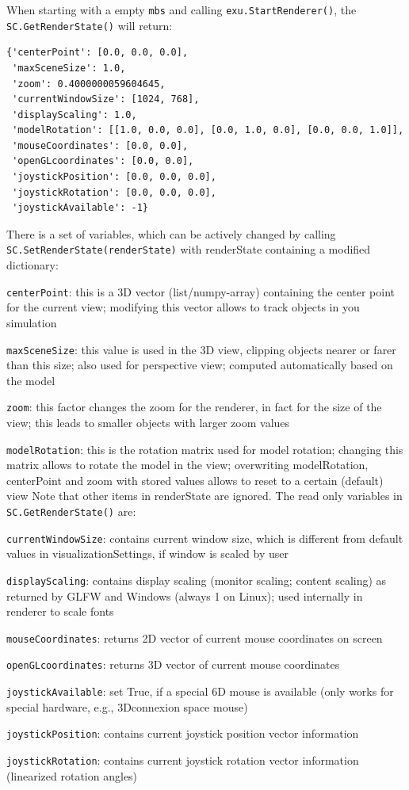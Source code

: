 When starting with a empty \texttt{mbs} and calling \texttt{exu.StartRenderer()}, the \texttt{SC.GetRenderState()} will return:
\pythonstyle\begin{lstlisting}
{'centerPoint': [0.0, 0.0, 0.0],
 'maxSceneSize': 1.0,
 'zoom': 0.4000000059604645,
 'currentWindowSize': [1024, 768],
 'displayScaling': 1.0,
 'modelRotation': [[1.0, 0.0, 0.0], [0.0, 1.0, 0.0], [0.0, 0.0, 1.0]],
 'mouseCoordinates': [0.0, 0.0],
 'openGLcoordinates': [0.0, 0.0],
 'joystickPosition': [0.0, 0.0, 0.0],
 'joystickRotation': [0.0, 0.0, 0.0],
 'joystickAvailable': -1}
\end{lstlisting}

There is a set of variables, which can be actively changed by calling  \texttt{SC.SetRenderState(renderState)} with renderState
containing a modified dictionary:
\bi
  \item \texttt{centerPoint}: this is a 3D vector (list/numpy-array) containing the center point for the current view; modifying this vector allows to track objects in you simulation
  \item \texttt{maxSceneSize}: this value is used in the 3D view, clipping objects nearer or farer than this size; also used for perspective view; computed automatically based on the model
  \item \texttt{zoom}: this factor changes the zoom for the renderer, in fact for the size of the view; this leads to smaller objects with larger zoom values
  \item \texttt{modelRotation}: this is the rotation matrix used for model rotation; changing this matrix allows to rotate the model in the view; overwriting modelRotation, centerPoint and zoom with stored values allows to reset to a certain (default) view
\ei
Note that other items in renderState are ignored. The read only variables in \texttt{SC.GetRenderState()} are:
\bi
  \item \texttt{currentWindowSize}: contains current window size, which is different from default values in visualizationSettings, if window is scaled by user
  \item \texttt{displayScaling}: contains display scaling (monitor scaling; content scaling) as returned by GLFW and Windows (always 1 on Linux); used internally in renderer to scale fonts
  \item \texttt{mouseCoordinates}: returns 2D vector of current mouse coordinates on screen
  \item \texttt{openGLcoordinates}: returns 3D vector of current mouse coordinates
  \item \texttt{joystickAvailable}: set True, if a special 6D mouse is available (only works for special hardware, e.g., 3Dconnexion space mouse)
  \item \texttt{joystickPosition}: contains current joystick position vector information 
  \item \texttt{joystickRotation}: contains current joystick rotation vector information (linearized rotation angles)
\ei

